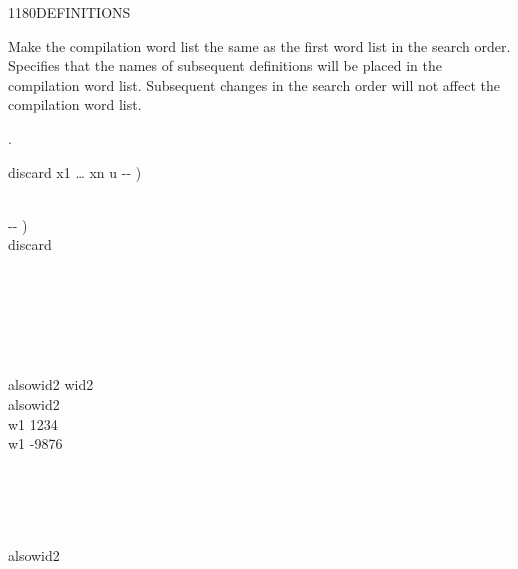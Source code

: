 \begin{worddef}{1180}{DEFINITIONS}
\item \stack{}{}

	Make the compilation word list the same as the first word list
	in the search order. Specifies that the names of subsequent
	definitions will be placed in the compilation word list.
	Subsequent changes in the search order will not affect the
	compilation word list.

\see {}.

	\begin{implement} %
		\word{:} discard  x1 {\ldots} xn u -{}- ) \bs{}  \\
		    \\
		\word{;}

		\word{:}   -{}- ) \\
		\tab {}    discard \\
		\word{;}
	\end{implement}

	\begin{testing} %
		\ttfamily
		 \\

		 \\
		 \\
		 \\

		\word{:} alsowid2   wid2      \word{;} \\
		alsowid2 \\
		\word{:} w1 1234 \word{;} \\
		\word{:} w1 -9876 \word{;} 

		  \\
		 \\
		 \\
		 \\
		alsowid2 \\
		 \\


\end{testing}
\end{worddef}
